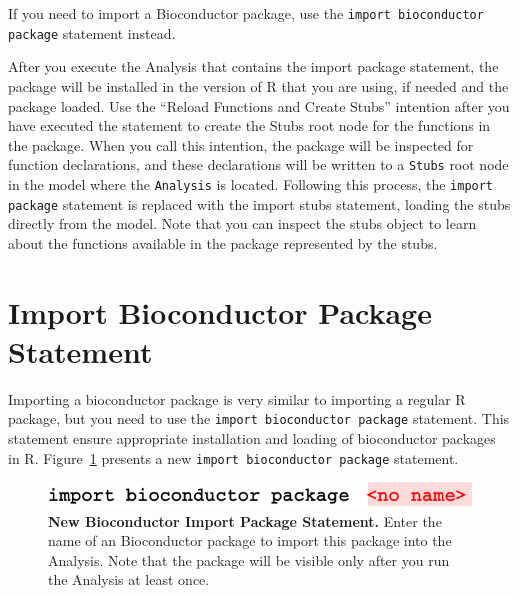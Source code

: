 \begin{remark}
If you need to import a Bioconductor package, use the \texttt{import bioconductor package} statement instead.
\end{remark}
After you execute the Analysis that contains the import package statement, the package will be installed in the version of R that you are using, if needed and the package loaded. 
Use the ``Reload Functions and Create Stubs'' intention after you have executed the statement to create the Stubs root node for the functions in the package. When you call this intention, the package will be inspected for function declarations, and these declarations will be written to a \texttt{Stubs} root node in the model where the \texttt{Analysis} is located. Following this process, the \texttt{import package} statement is replaced with the import stubs statement, loading the stubs directly from the model. Note that you can inspect the stubs object to learn about the functions available in the package represented by the stubs. 


\section{Import Bioconductor Package Statement}\label{sec:ImportBioconductorPackageStatement}
Importing a bioconductor package is very similar to importing a regular R package, but you need to use the \texttt{import bioconductor package} statement. This statement ensure appropriate installation and loading of bioconductor packages in R. Figure~\ref{fig:NewBioconductorImportPackage} presents a new \texttt{import bioconductor package} statement.

\begin{figure}[h!tbp]
  \centering
  \includegraphics[width=\figWidthNarrow]{figures/NewImportBioconductorPackage.pdf}
\caption[New Import Bioconductor Package Statement.]{\textbf{New Bioconductor Import Package Statement.}  Enter the name of an Bioconductor package to import this package into the Analysis. Note that the package will be visible only after you run the Analysis at least once.}
\label{fig:NewBioconductorImportPackage}
\end{figure}

